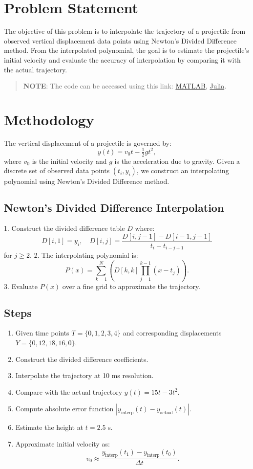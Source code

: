 \section*{Problem Statement}
The objective of this problem is to interpolate the trajectory of a projectile from observed vertical displacement data points using Newton’s Divided Difference method. From the interpolated polynomial, the goal is to estimate the projectile’s initial velocity and evaluate the accuracy of interpolation by comparing it with the actual trajectory.

\begin{quote}
  \textbf{NOTE}: The code can be accessed using this link: \href{https://raw.githubusercontent.com/HavokSahil/computational-techniques-assignments/refs/heads/main/assignment4/a1.m}{MATLAB}, \href{https://raw.githubusercontent.com/HavokSahil/computational-techniques-assignments/refs/heads/main/assignment4/a1.jl}{Julia}.
\end{quote}


\section*{Methodology}
The vertical displacement of a projectile is governed by:
\[
y(t) = v_0 t - \tfrac{1}{2} g t^2,
\]
where $v_0$ is the initial velocity and $g$ is the acceleration due to gravity. Given a discrete set of observed data points $(t_i, y_i)$, we construct an interpolating polynomial using Newton’s Divided Difference method.

\subsection*{Newton’s Divided Difference Interpolation}
1. Construct the divided difference table $D$ where:
\[
D[i,1] = y_i, \quad D[i,j] = \frac{D[i,j-1] - D[i-1,j-1]}{t_i - t_{i-j+1}}
\]
for $j \geq 2$.
2. The interpolating polynomial is:
\[
P(x) = \sum_{k=1}^N \left( D[k,k] \prod_{j=1}^{k-1}(x - t_j) \right).
\]
3. Evaluate $P(x)$ over a fine grid to approximate the trajectory.

\subsection*{Steps}
\begin{enumerate}
  \item Given time points $T = \{0,1,2,3,4\}$ and corresponding displacements $Y = \{0, 12, 18, 16, 0\}$.
  \item Construct the divided difference coefficients.
  \item Interpolate the trajectory at 10 ms resolution.
  \item Compare with the actual trajectory $y(t) = 15t - 3t^2$.
  \item Compute absolute error function $|y_{\text{interp}}(t) - y_{\text{actual}}(t)|$.
  \item Estimate the height at $t=2.5$ s.
  \item Approximate initial velocity as:
  \[
  v_0 \approx \frac{y_{\text{interp}}(t_1) - y_{\text{interp}}(t_0)}{\Delta t}.
  \]
\end{enumerate}

